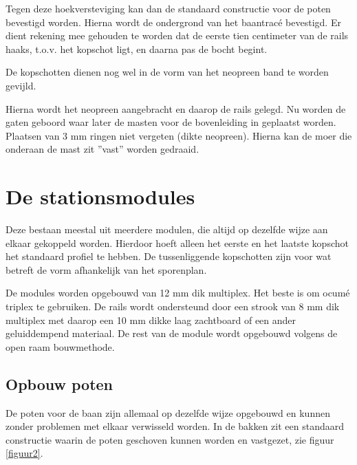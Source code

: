 \documentclass[12pt,a4paper]{report}
\newcommand*{\trace}{trac\'{e} }
\begin{document}
Tegen deze hoekversteviging kan dan de standaard constructie voor de poten bevestigd worden. Hierna wordt de ondergrond van het baan\trace bevestigd. Er dient rekening mee gehouden te worden dat de eerste tien centimeter van de rails haaks, t.o.v. het kopschot ligt, en daarna pas de bocht begint. 

De kopschotten dienen nog wel in de vorm van het neopreen band te worden gevijld. 

Hierna wordt het neopreen aangebracht en daarop de rails gelegd. Nu worden de gaten geboord waar later de masten voor de bovenleiding in geplaatst worden. 
Plaatsen van 3 mm ringen niet vergeten (dikte neopreen).
Hierna kan de moer die onderaan de mast zit ''vast'' worden gedraaid.

\section{De stationsmodules}
Deze bestaan meestal uit meerdere modulen, die altijd op dezelfde wijze aan elkaar gekoppeld worden. Hierdoor hoeft alleen het eerste en het laatste kopschot het standaard profiel te hebben. De tussenliggende kopschotten zijn voor wat betreft de vorm afhankelijk van het sporenplan.

De modules worden opgebouwd van 12 mm dik multiplex. Het beste is om ocum\'{e} triplex te gebruiken. De rails wordt ondersteund door een strook van 8 mm dik multiplex met daarop een 10 mm dikke laag zachtboard of een ander geluiddempend materiaal.
De rest van de module wordt opgebouwd volgens de open raam bouwmethode.

\subsection{Opbouw poten}
De poten voor de baan zijn allemaal op dezelfde wijze opgebouwd en kunnen zonder problemen met elkaar verwisseld worden. In de bakken zit een standaard constructie waarin de poten geschoven kunnen worden en vastgezet, zie figuur \ref{figuur2}.
\end{document}

